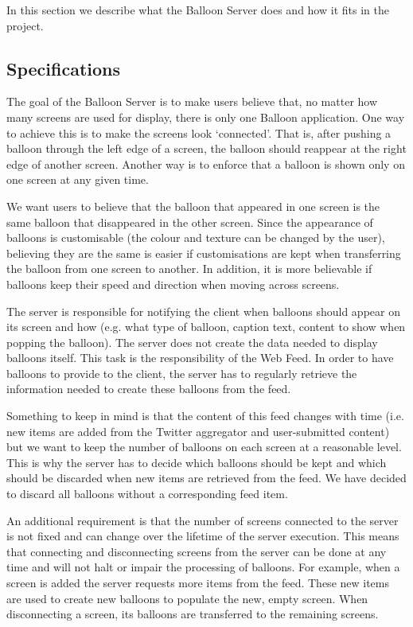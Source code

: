 In this section we describe what the Balloon Server does and how it fits in the
project. 

\subsection{Specifications}

The goal of the Balloon Server is to make users believe that, no matter how
many screens are used for display, there is only one Balloon application. One
way to achieve this is to make the screens look `connected'. That is, after
pushing a balloon through the left edge of a screen, the balloon should
reappear at the right edge of another screen. Another way is to enforce that a
balloon is shown only on one screen at any given time.

We want users to believe that the balloon that appeared in one screen is the
same balloon that disappeared in the other screen. Since the appearance of
balloons is customisable (the colour and texture can be changed by the user),
believing they are the same is easier if customisations are kept when
transferring the balloon from one screen to another. In addition, it is more
believable if balloons keep their speed and direction when moving across 
screens.

The server is responsible for notifying the client when balloons should appear
on its screen and how (e.g. what type of balloon, caption text, content
to show when popping the balloon). The server does not create the data needed to
display balloons itself. This task is the responsibility of the Web Feed. In
order to have balloons to provide to the client, the server has to regularly
retrieve the information needed to create these balloons from the feed.

Something to keep in mind is that the content of this feed changes with time
(i.e. new items are added from the Twitter aggregator and user-submitted 
content) but we want to keep the number of balloons on each screen at a
reasonable level. This is why the server has to decide which balloons should be
kept and which should be discarded when new items are retrieved from the feed.
We have decided to discard all balloons without a corresponding feed item.

An additional requirement is that the number of screens connected to the server
is not fixed and can change over the lifetime of the server execution. This
means that connecting and disconnecting screens from the server can be done at
any time and will not halt or impair the processing of balloons. For example, 
when a screen is added the server requests more items from the feed. These new
items are used to create new balloons to populate the new, empty screen. When 
disconnecting a screen, its balloons are transferred to the remaining screens.

